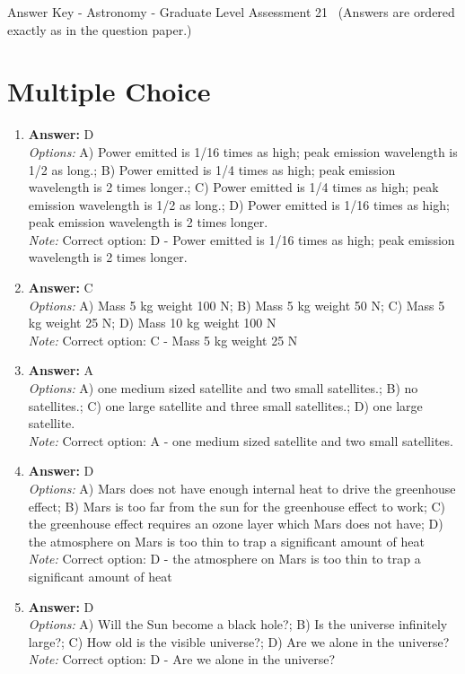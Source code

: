 \documentclass[12pt]{article}
\begin{document}
\begin{center}
Answer Key - Astronomy - Graduate Level Assessment 21 \
\small (Answers are ordered exactly as in the question paper.)
\end{center}

\section*{Multiple Choice}
\begin{enumerate}[label=\arabic*.]
\item \textbf{Answer:} D
\\ \textit{Options:} A) Power emitted is 1/16 times as high; peak emission wavelength is 1/2 as long.; B) Power emitted is 1/4 times as high; peak emission wavelength is 2 times longer.; C) Power emitted is 1/4 times as high; peak emission wavelength is 1/2 as long.; D) Power emitted is 1/16 times as high; peak emission wavelength is 2 times longer.
\\ \textit{Note:} Correct option: D - Power emitted is 1/16 times as high; peak emission wavelength is 2 times longer.
\item \textbf{Answer:} C
\\ \textit{Options:} A) Mass 5 kg weight 100 N; B) Mass 5 kg weight 50 N; C) Mass 5 kg weight 25 N; D) Mass 10 kg weight 100 N
\\ \textit{Note:} Correct option: C - Mass 5 kg weight 25 N
\item \textbf{Answer:} A
\\ \textit{Options:} A) one medium sized satellite and two small satellites.; B) no satellites.; C) one large satellite and three small satellites.; D) one large satellite.
\\ \textit{Note:} Correct option: A - one medium sized satellite and two small satellites.
\item \textbf{Answer:} D
\\ \textit{Options:} A) Mars does not have enough internal heat to drive the greenhouse effect; B) Mars is too far from the sun for the greenhouse effect to work; C) the greenhouse effect requires an ozone layer which Mars does not have; D) the atmosphere on Mars is too thin to trap a significant amount of heat
\\ \textit{Note:} Correct option: D - the atmosphere on Mars is too thin to trap a significant amount of heat
\item \textbf{Answer:} D
\\ \textit{Options:} A) Will the Sun become a black hole?; B) Is the universe infinitely large?; C) How old is the visible universe?; D) Are we alone in the universe?
\\ \textit{Note:} Correct option: D - Are we alone in the universe?
\end{enumerate}
\end{document}
